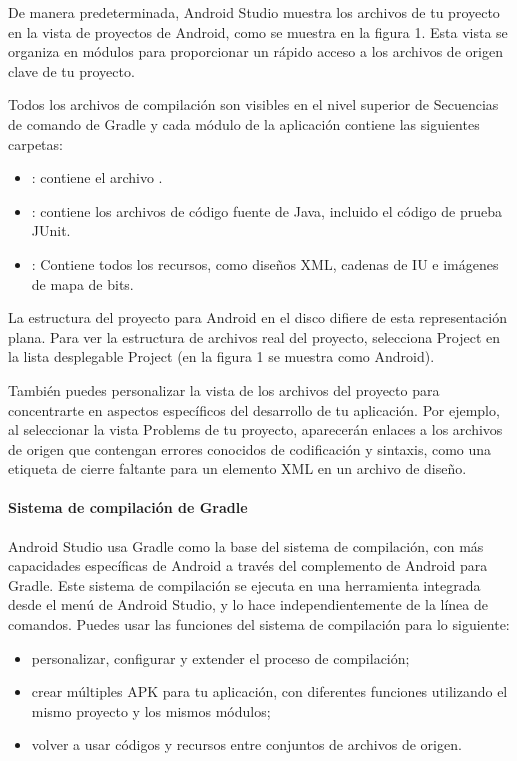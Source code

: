 De manera predeterminada, Android Studio muestra los archivos de tu proyecto en la vista de proyectos de Android, como se muestra en la figura 1. Esta vista se organiza en módulos para proporcionar un rápido acceso a los archivos de origen clave de tu proyecto.

Todos los archivos de compilación son visibles en el nivel superior de Secuencias de comando de Gradle y cada módulo de la aplicación contiene las siguientes carpetas:
\begin{itemize}
\item {} 
: contiene el archivo .

\item {} 
: contiene los archivos de código fuente de Java, incluido el código de prueba JUnit.

\item {} 
: Contiene todos los recursos, como diseños XML, cadenas de IU e imágenes de mapa de bits.

\end{itemize}

La estructura del proyecto para Android en el disco difiere de esta representación plana. Para ver la estructura de archivos real del proyecto, selecciona Project en la lista desplegable Project (en la figura 1 se muestra como Android).

También puedes personalizar la vista de los archivos del proyecto para concentrarte en aspectos específicos del desarrollo de tu aplicación. Por ejemplo, al seleccionar la vista Problems de tu proyecto, aparecerán enlaces a los archivos de origen que contengan errores conocidos de codificación y sintaxis, como una etiqueta de cierre faltante para un elemento XML en un archivo de diseño.


\paragraph{Sistema de compilación de Gradle}
\label{\detokenize{dev_docs:sistema-de-compilacion-de-gradle}}
Android Studio usa Gradle como la base del sistema de compilación, con más capacidades específicas de Android a través del complemento de Android para Gradle. Este sistema de compilación se ejecuta en una herramienta integrada desde el menú de Android Studio, y lo hace independientemente de la línea de comandos. Puedes usar las funciones del sistema de compilación para lo siguiente:
\begin{itemize}
\item {} 
personalizar, configurar y extender el proceso de compilación;

\item {} 
crear múltiples APK para tu aplicación, con diferentes funciones utilizando el mismo proyecto y los mismos módulos;

\item {} 
volver a usar códigos y recursos entre conjuntos de archivos de origen.

\end{itemize}

